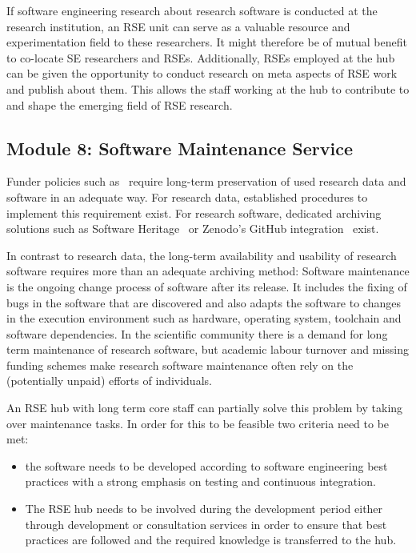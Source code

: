 \documentclass[a4paper]{article}
\begin{document}
If software engineering research about research software is conducted at the research institution, an RSE unit can serve as a valuable resource and experimentation field to these researchers.
It might therefore be of mutual benefit to co-locate SE researchers and RSEs.
Additionally, RSEs employed at the hub can be given the opportunity to conduct research on meta aspects of RSE work and publish about them.
This allows the staff working at the hub to contribute to and shape the emerging field of RSE research.

\subsection{Module 8: Software Maintenance Service}%
\label{sec:maintenance}

Funder policies such as~\autocite{dfg_gsp} require long-term preservation of used research data and software in an adequate way.
For research data, established procedures to implement this requirement exist.
For research software, dedicated archiving solutions such as Software Heritage~\autocite{DiCosmo2020,DiCosmo2023} or Zenodo's GitHub integration~\autocite{GitHubZenodo} exist.

In contrast to research data, the long-term availability and usability of research software requires more than an adequate archiving method:
Software maintenance is the ongoing change process of software after its release.
It includes the fixing of bugs in the software that are discovered and also adapts the software to changes in the execution environment such as hardware, operating system, toolchain and software dependencies.
In the scientific community there is a demand for long term maintenance of research software,
but academic labour turnover and missing funding schemes make research software maintenance often rely on the (potentially unpaid) efforts of individuals.

An RSE hub with long term core staff can partially solve this problem by taking over maintenance tasks.
In order for this to be feasible two criteria need to be met:
\begin{itemize}
\item the software needs to be developed according to software engineering best practices with a strong emphasis on testing and continuous integration.
\item The RSE hub needs to be involved during the development period either through development or consultation services in order to ensure that best practices are followed and the required knowledge is transferred to the hub.
\end{itemize}
\end{document}

